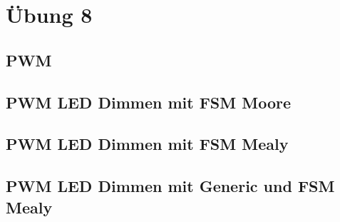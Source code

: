 \section{Übung 8}
\subsection{PWM}
\subsection{PWM LED Dimmen mit FSM Moore}

\subsection{PWM LED Dimmen mit FSM Mealy}

\subsection{PWM LED Dimmen mit Generic und FSM Mealy}
